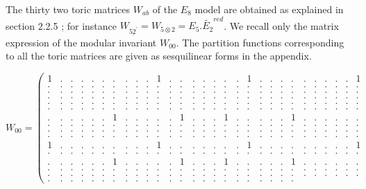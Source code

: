 \documentclass[a4paper,11pt]{article}
\def \otimesdot {\stackrel{\cdot}{\otimes}}
\newcommand{\ud}[1]{\underline{#1}}
\begin{document}
The thirty two toric matrices $W_{ab}$ of the $E_{8}$ model are obtained
as explained in section 2.2.5 ;  for instance $W_{\ud{52^{'}}} =
W_{5\otimesdot 2}=
E_{5}.\widetilde{E_{2}}^{red}$.
We recall only the matrix expression of
the modular invariant $W_{00}$.  The partition functions
corresponding to all the toric matrices are given as
sesquilinear forms in the appendix.


\scriptsize
$$
W_{00}=\left(
\begin{array}{ccccccccccccccccccccccccccccc}
1 &. &. &. &. &. &. &. &. &. &1 &. &. &. &. &. &. &. &1 &. &. &. &.
&. &. &. &. &. &1 \\
. &. &. &. &. &. &. &. &. &. &. &. &. &. &. &. &. &. &. &. &. &. &.
&. &. &. &. &. &. \\
. &. &. &. &. &. &. &. &. &. &. &. &. &. &. &. &. &. &. &. &. &. &.
&. &. &. &. &. &. \\
. &. &. &. &. &. &. &. &. &. &. &. &. &. &. &. &. &. &. &. &. &. &.
&. &. &. &. &. &. \\
. &. &. &. &. &. &. &. &. &. &. &. &. &. &. &. &. &. &. &. &. &. &.
&. &. &. &. &. &. \\
. &. &. &. &. &. &. &. &. &. &. &. &. &. &. &. &. &. &. &. &. &. &.
&. &. &. &. &. &. \\
. &. &. &. &. &. &1 &. &. &. &. &. &1 &. &. &. &1 &. &. &. &. &. &1
&. &. &. &. &. &. \\
. &. &. &. &. &. &. &. &. &. &. &. &. &. &. &. &. &. &. &. &. &. &.
&. &. &. &. &. &. \\
. &. &. &. &. &. &. &. &. &. &. &. &. &. &. &. &. &. &. &. &. &. &.
&. &. &. &. &. &. \\
. &. &. &. &. &. &. &. &. &. &. &. &. &. &. &. &. &. &. &. &. &. &.
&. &. &. &. &. &. \\
1 &. &. &. &. &. &. &. &. &. &1 &. &. &. &. &. &. &. &1 &. &. &. &.
&. &. &. &. &. &1 \\
. &. &. &. &. &. &. &. &. &. &. &. &. &. &. &. &. &. &. &. &. &. &.
&. &. &. &. &. &. \\
. &. &. &. &. &. &1 &. &. &. &. &. &1 &. &. &. &1 &. &. &. &. &. &1
&. &. &. &. &. &. \\
. &. &. &. &. &. &. &. &. &. &. &. &. &. &. &. &. &. &. &. &. &. &.
&. &. &. &. &. &. \\
. &. &. &. &. &. &. &. &. &. &. &. &. &. &. &. &. &. &. &. &. &. &.
&. &. &. &. &. &. \\
. &. &. &. &. &. &. &. &. &. &. &. &. &. &. &. &. &. &. &. &. &. &.

\end{array}$$
\end{document}
